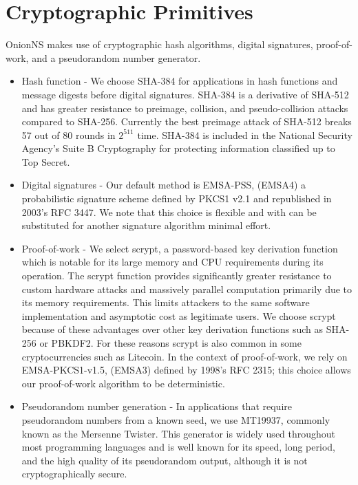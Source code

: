 \section{Cryptographic Primitives}

OnionNS makes use of cryptographic hash algorithms, digital signatures, proof-of-work, and a pseudorandom number generator.

\begin{itemize}
	\item Hash function - We choose SHA-384 for applications in hash functions and message digests before digital signatures. SHA-384 is a derivative of SHA-512 and has greater resistance to preimage, collision, and pseudo-collision attacks compared to SHA-256. Currently the best preimage attack of SHA-512 breaks 57 out of 80 rounds in $ 2^{511} $ time.\cite{li2012converting} SHA-384 is included in the National Security Agency's Suite B Cryptography for protecting information classified up to Top Secret.
	\item Digital signatures - Our default method is EMSA-PSS, (EMSA4) a probabilistic signature scheme defined by PKCS1 v2.1 and republished in 2003's RFC 3447. We note that this choice is flexible and with can be substituted for another signature algorithm  minimal effort.
	\item Proof-of-work - We select scrypt, a password-based key derivation function which is notable for its large memory and CPU requirements during its operation. The scrypt function provides significantly greater resistance to custom hardware attacks and massively parallel computation primarily due to its memory requirements. This limits attackers to the same software implementation and asymptotic cost as legitimate users.\cite{percival2009stronger}\cite{percival2012scrypt} We choose scrypt because of these advantages over other key derivation functions such as SHA-256 or PBKDF2. For these reasons scrypt is also common in some cryptocurrencies such as Litecoin. In the context of proof-of-work, we rely on EMSA-PKCS1-v1.5, (EMSA3) defined by 1998's RFC 2315; this choice allows our proof-of-work algorithm to be deterministic.
	\item Pseudorandom number generation - In applications that require pseudorandom numbers from a known seed, we use MT19937, commonly known as the Mersenne Twister. This generator is widely used throughout most programming languages and is well known for its speed, long period, and the high quality of its pseudorandom output, although it is not cryptographically secure.\cite{matsumoto1998mersenne}
\end{itemize}


